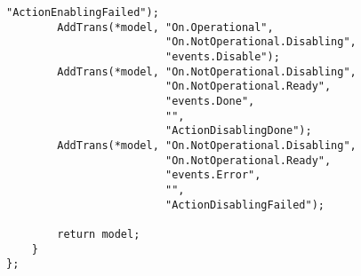 \begin{lstlisting}[language=CXX, label={lst:annex_basic_model}, caption={Basic life cycle without omissions.}]
                         "ActionEnablingFailed");
        AddTrans(*model, "On.Operational",
                         "On.NotOperational.Disabling",
                         "events.Disable");
        AddTrans(*model, "On.NotOperational.Disabling",
                         "On.NotOperational.Ready",
                         "events.Done",
                         "",
                         "ActionDisablingDone");
        AddTrans(*model, "On.NotOperational.Disabling",
                         "On.NotOperational.Ready",
                         "events.Error",
                         "",
                         "ActionDisablingFailed");

        return model;
    }
};
\end{lstlisting}



